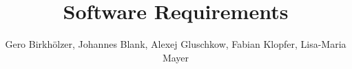 \title{Software Requirements}
\author{Gero Birkhölzer, Johannes Blank, Alexej Gluschkow, Fabian Klopfer, Lisa-Maria Mayer}
\maketitle
